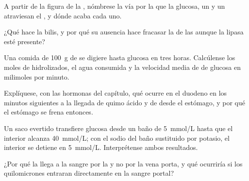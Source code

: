 \begin{exercise}[$\star$]\label{exo:b1:digestion-absorption:3}
A partir de la figura de la , nómbrese la vía por la que la
glucosa, un  y un  atraviesan el , y dónde
acaba cada uno.
\end{exercise}

\begin{exercise}[$\star$]\label{exo:b1:digestion-absorption:4}
¿Qué hace la bilis, y por qué su ausencia hace fracasar la  de las
 aunque la lipasa esté presente?
\end{exercise}

\begin{exercise}[$\star\star$]\label{exo:b1:digestion-absorption:5}
Una comida de \qty{100}{g} de  se digiere hasta glucosa en tres
horas. Calcúlense los moles de  hidrolizados, el agua
consumida y la velocidad media de  de glucosa en milimoles por
minuto.
\end{exercise}

\begin{exercise}[$\star\star$]\label{exo:b1:digestion-absorption:6}
Explíquese, con las hormonas del capítulo, qué ocurre en el duodeno en los
minutos siguientes a la llegada de quimo ácido y de  desde el estómago,
y por qué el estómago se frena entonces.
\end{exercise}

\begin{exercise}[$\star\star$]\label{exo:b1:digestion-absorption:7}
Un saco evertido transfiere glucosa desde un baño de \qty{5}{mmol/L} hasta
que el interior alcanza \qty{40}{mmol/L}; con el sodio del baño sustituido
por potasio, el interior se detiene en \qty{5}{mmol/L}. Interprétense ambos
resultados.
\end{exercise}

\begin{exercise}[$\star\star$]\label{exo:b1:digestion-absorption:8}
¿Por qué la  llega a la sangre por la  y no por la vena porta, y
qué ocurriría si los quilomicrones entraran directamente en la sangre
portal?
\end{exercise}

